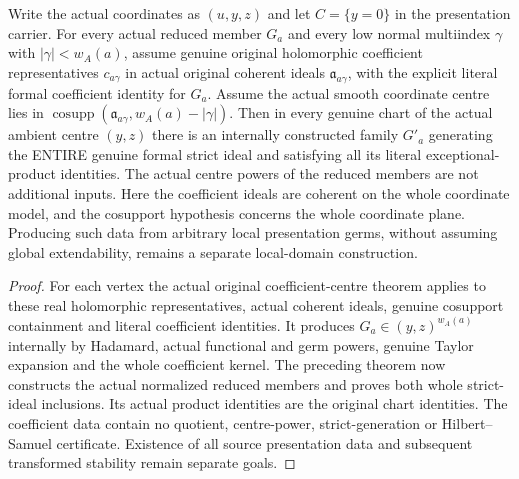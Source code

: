 \begin{theorem}
\label{hir:actual-original-coefficient-cosupport-reduced-strict-generators}
\leanok
Write the actual coordinates as $(u,y,z)$ and let $C=\{y=0\}$ in the
presentation carrier. For every actual reduced member $G_a$ and every low
normal multiindex $\gamma$ with $|\gamma|<w_A(a)$, assume genuine original
holomorphic coefficient representatives $c_{a\gamma}$ in actual original
coherent ideals $\mathfrak a_{a\gamma}$, with the explicit literal formal
coefficient identity for $G_a$. Assume the actual smooth coordinate centre
lies in $\operatorname{cosupp}(\mathfrak a_{a\gamma},w_A(a)-|\gamma|)$.
Then in every genuine chart of the actual ambient centre $(y,z)$ there is
an internally constructed family $G'_a$ generating the ENTIRE genuine formal
strict ideal and satisfying all its literal exceptional-product identities.
The actual centre powers of the reduced members are not additional inputs.
Here the coefficient ideals are coherent on the whole coordinate model,
and the cosupport hypothesis concerns the whole coordinate plane. Producing
such data from arbitrary local presentation germs, without assuming global
extendability, remains a separate local-domain construction.
\end{theorem}
\begin{proof}
For each vertex the actual original coefficient-centre theorem applies to
these real holomorphic representatives, actual coherent ideals, genuine
cosupport containment and literal coefficient identities. It produces
$G_a\in(y,z)^{w_A(a)}$ internally by Hadamard, actual functional and germ
powers, genuine Taylor expansion and the whole coefficient kernel.
The preceding theorem now constructs the actual normalized reduced members
and proves both whole strict-ideal inclusions. Its actual product identities
are the original chart identities. The coefficient data contain no quotient,
centre-power, strict-generation or Hilbert--Samuel certificate. Existence of
all source presentation data and subsequent transformed stability remain
separate goals.
\end{proof}
